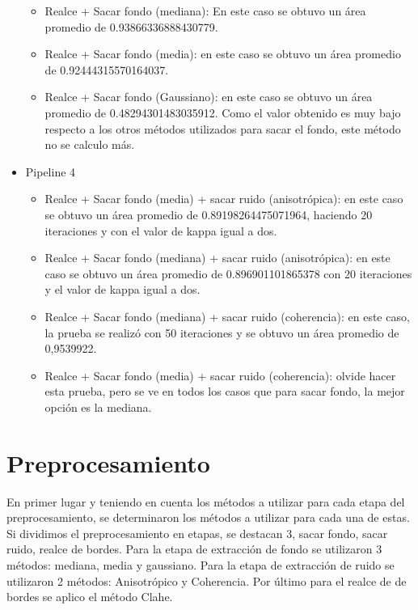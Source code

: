 \begin{itemize}
\begin{itemize}
			\item Realce + Sacar fondo (mediana): En este caso se obtuvo un área promedio de 0.93866336888430779.
			\item Realce + Sacar fondo (media): en este caso se obtuvo un área promedio de 0.92444315570164037.
			\item Realce + Sacar fondo (Gaussiano): en este caso se obtuvo un área promedio de 0.48294301483035912. Como el valor obtenido es muy bajo respecto a los otros métodos utilizados para sacar el fondo, este método no se calculo más.
		\end{itemize}
	\item Pipeline 4
		\begin{itemize}
			\item Realce + Sacar fondo (media) + sacar ruido (anisotrópica): en este caso se obtuvo un área promedio de 0.89198264475071964, haciendo 20 iteraciones y con el valor de kappa igual a dos.
			\item Realce + Sacar fondo (mediana) + sacar ruido (anisotrópica): en este caso se obtuvo un área promedio de 0.896901101865378 con 20 iteraciones y el valor de kappa igual a dos.
			\item Realce + Sacar fondo (mediana) + sacar ruido (coherencia): en este caso, la prueba se realizó con 50 iteraciones y se obtuvo un área promedio de 0,9539922.
			\item Realce + Sacar fondo (media) + sacar ruido (coherencia): olvide hacer esta prueba, pero se ve en todos los casos que para sacar fondo, la mejor opción es la mediana.
		\end{itemize}
\end{itemize}


\section{Preprocesamiento}
En primer lugar y teniendo en cuenta los m\'etodos a utilizar para cada etapa del preprocesamiento, se determinaron los m\'etodos a utilizar para cada una de estas. Si dividimos el preprocesamiento en etapas, se destacan 3, sacar fondo, sacar ruido, realce de bordes. Para la etapa de extracci\'on de fondo se utilizaron 3 m\'etodos: mediana, media y gaussiano. Para la etapa de extracci\'on de ruido se utilizaron 2 m\'etodos: Anisotr\'opico y Coherencia. Por \'ultimo para el realce de de bordes se aplico el m\'etodo Clahe.


